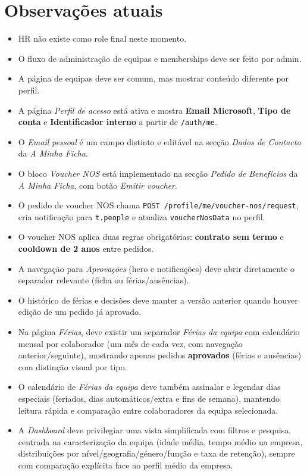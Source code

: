 \documentclass[11pt,a4paper]{article}
\begin{document}
\section{Observações atuais}
\begin{itemize}
  \item HR não existe como role final neste momento.
  \item O fluxo de administração de equipas e memberships deve ser feito por admin.
  \item A página de equipas deve ser comum, mas mostrar conteúdo diferente por perfil.
  \item A página \textit{Perfil de acesso} está ativa e mostra \textbf{Email Microsoft}, \textbf{Tipo de conta} e \textbf{Identificador interno} a partir de \texttt{/auth/me}.
  \item O \textit{Email pessoal} é um campo distinto e editável na secção \textit{Dados de Contacto} da \textit{A Minha Ficha}.
  \item O bloco \textit{Voucher NOS} está implementado na secção \textit{Pedido de Benefícios} da \textit{A Minha Ficha}, com botão \textit{Emitir voucher}.
  \item O pedido de voucher NOS chama \texttt{POST /profile/me/voucher-nos/request}, cria notificação para \texttt{t.people} e atualiza \texttt{voucherNosData} no perfil.
  \item O voucher NOS aplica duas regras obrigatórias: \textbf{contrato sem termo} e \textbf{cooldown de 2 anos} entre pedidos.
  \item A navegação para \textit{Aprovações} (hero e notificações) deve abrir diretamente o separador relevante (ficha ou férias/ausências).
  \item O histórico de férias e decisões deve manter a versão anterior quando houver edição de um pedido já aprovado.
  \item Na página \textit{Férias}, deve existir um separador \textit{Férias da equipa} com calendário mensal por colaborador (um mês de cada vez, com navegação anterior/seguinte), mostrando apenas pedidos \textbf{aprovados} (férias e ausências) com distinção visual por tipo.
  \item O calendário de \textit{Férias da equipa} deve também assinalar e legendar dias especiais (feriados, dias automáticos/extra e fins de semana), mantendo leitura rápida e comparação entre colaboradores da equipa selecionada.
  \item A \textit{Dashboard} deve privilegiar uma vista simplificada com filtros e pesquisa, centrada na caracterização da equipa (idade média, tempo médio na empresa, distribuições por nível/geografia/género/função e taxa de retenção), sempre com comparação explícita face ao perfil médio da empresa.

\end{itemize}
\end{document}
